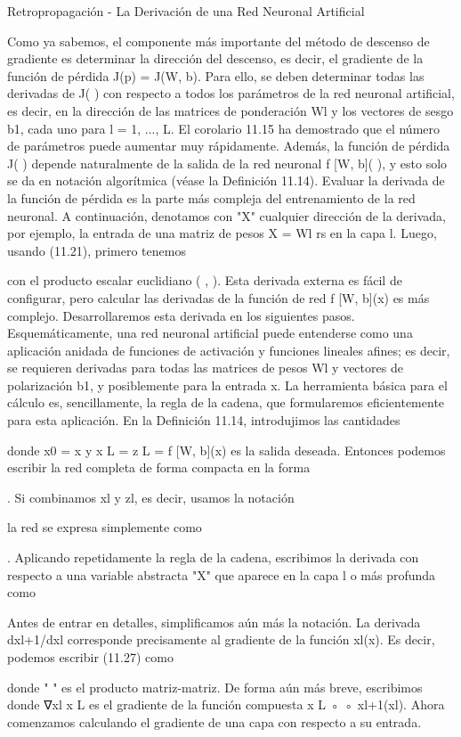 \begin{frame}
  Retropropagación - La Derivación de una Red Neuronal Artificial

  Como ya sabemos, el componente más importante del método de descenso de gradiente es determinar la dirección del descenso, es decir, el gradiente de la función de pérdida J(p) = J(W, b).
  Para ello, se deben determinar todas las derivadas de J( ) con respecto a todos los parámetros de la red neuronal artificial, es decir, en la dirección de las matrices de ponderación Wl y los vectores de sesgo b1, cada uno para l = 1, ..., L. El corolario 11.15 ha demostrado que el número de parámetros puede aumentar muy rápidamente. Además, la función de pérdida J( ) depende naturalmente de la salida de la red neuronal f [W, b]( ), y esto solo se da en notación algorítmica (véase la Definición 11.14). Evaluar la derivada de la función de pérdida es la parte más compleja del entrenamiento de la red neuronal. A continuación, denotamos con "X" cualquier dirección de la derivada, por ejemplo, la entrada de una matriz de pesos X = Wl
  rs en la capa l. Luego, usando (11.21), primero tenemos

  con el producto escalar euclidiano ( , ). Esta derivada externa es fácil de configurar, pero calcular las derivadas de la función de red f [W, b](x)
  es más complejo. Desarrollaremos esta derivada en los siguientes pasos.
  Esquemáticamente, una red neuronal artificial puede entenderse como una aplicación anidada de funciones de activación y funciones lineales afines; es decir, se requieren derivadas para todas las matrices de pesos Wl y vectores de polarización b1, y posiblemente para la entrada x. La herramienta básica para el cálculo es, sencillamente, la regla de la cadena, que formularemos eficientemente para esta aplicación. En la Definición 11.14, introdujimos las cantidades

  donde x0 = x y x L = z L = f [W, b](x) es la salida deseada. Entonces
  podemos escribir la red completa de forma compacta en la forma

  . Si combinamos xl y zl, es decir, usamos la notación

  la red se expresa simplemente como

  . Aplicando repetidamente la regla de la cadena, escribimos la derivada
  con respecto a una variable abstracta "X" que aparece en la capa l o más profunda como

  Antes de entrar en detalles, simplificamos aún más la notación. La derivada dxl+1/dxl
  corresponde precisamente al gradiente de la función xl(x). Es decir, podemos escribir (11.27)
  como

  donde " " es el producto matriz-matriz. De forma aún más breve, escribimos
  donde ∇xl x L es el gradiente de la función compuesta x L ◦ ◦ xl+1(xl).
  Ahora comenzamos calculando el gradiente de una capa con respecto a su
  entrada.
\end{frame}

